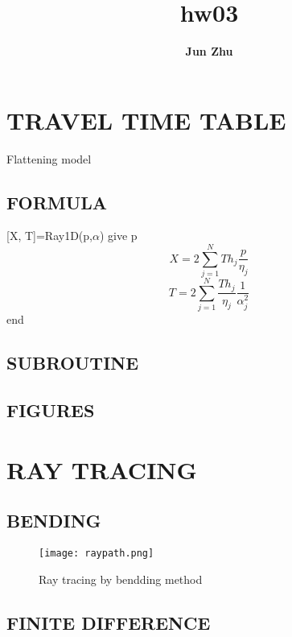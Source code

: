 \documentclass{article}
\title{\textbf{hw03}}
\author{\textbf{Jun Zhu}}
\begin{document}
\maketitle
\section{TRAVEL TIME TABLE}
Flattening model
\subsection{FORMULA}
[X, T]=Ray1D(p,$\alpha$)\newline
give p\newline
$$X=2\sum_{j=1}^{N}Th_j\frac{p}{\eta_j} $$
$$T=2\sum_{j=1}^{N}\frac{Th_j}{\eta_j}\frac{1}{\alpha_j^2} $$
end
\subsection{SUBROUTINE}
\subsection{FIGURES}
\section{RAY TRACING}
\subsection{BENDING}
\begin{figure}[H]
  \centering
  \texttt{[image: raypath.png]}
  \caption{Ray tracing by bendding method}
\end{figure}
\subsection{FINITE DIFFERENCE}
\end{document}
